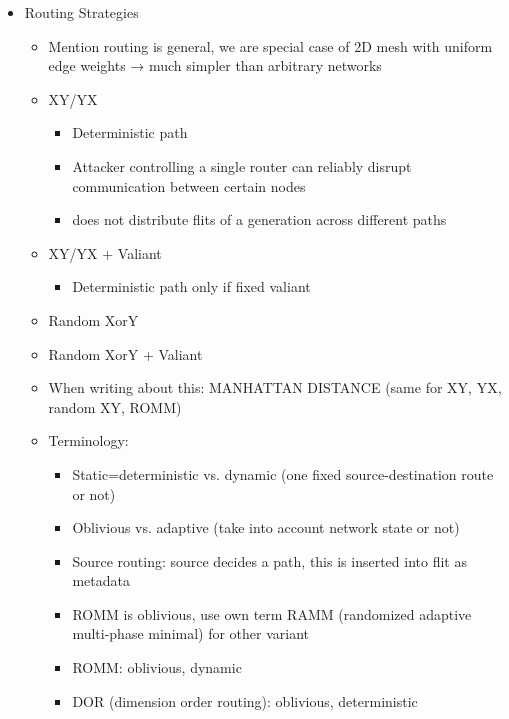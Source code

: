 \begin{itemize}
    \item Routing Strategies
        \begin{itemize}
            \item Mention routing is general, we are special case of 2D mesh with uniform edge weights → much simpler than arbitrary networks
            \item XY/YX
                \begin{itemize}
                    \item Deterministic path
                    \item Attacker controlling a single router can reliably disrupt communication between certain nodes
                    \item does not distribute flits of a generation across different paths
                \end{itemize}
            \item XY/YX + Valiant
                \begin{itemize}
                    \item Deterministic path only if fixed valiant
                \end{itemize}
            \item Random XorY
            \item Random XorY + Valiant
            \item When writing about this: MANHATTAN DISTANCE (same for XY, YX, random XY, ROMM)
            \item Terminology:
                \begin{itemize}
                    \item Static=deterministic vs. dynamic (one fixed source-destination route or not)
                    \item Oblivious vs. adaptive (take into account network state or not)
                    \item Source routing: source decides a path, this is inserted into flit as metadata
                    \item ROMM is oblivious, use own term RAMM (randomized adaptive multi-phase minimal) for other variant
                    \item ROMM: oblivious, dynamic
                    \item DOR (dimension order routing): oblivious, deterministic
                \end{itemize}
        \end{itemize}
\end{itemize}

